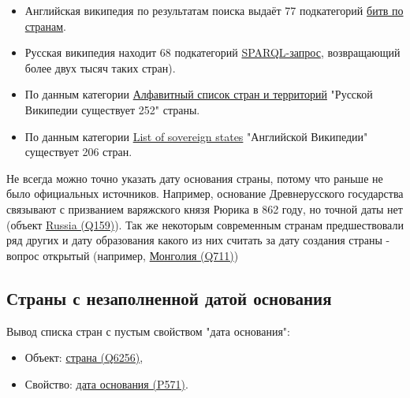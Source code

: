 
\begin{itemize}
    \item Английская википедия по результатам поиска выдаёт 77 подкатегорий \href{https://commons.wikimedia.org/wiki/Category:Battles_by_country}{битв по странам}.
    \item Русская википедия находит 68 подкатегорий \href{https://query.wikidata.org/#SELECT%20%3Fitem%20%3Flabel%20%3F_image%20WHERE%20%7B%0A%20%20%3Fitem%20wdt%3AP31%20wd%3AQ3024240.%0A%20%20SERVICE%20wikibase%3Alabel%20%7B%0A%20%20%20%20bd%3AserviceParam%20wikibase%3Alanguage%20%22en%22%20.%20%0A%20%20%20%20%3Fitem%20rdfs%3Alabel%20%3Flabel%0A%20%20%7D%0A%20%20%0AOPTIONAL%20%7B%20%3Fitem%20wdt%3AP18%20%3F_image.%20%7D%0A%7D%0A}{SPARQL-запрос}, возвращающий более двух тысяч таких стран).

    \item По данным категории \href{https://ru.wikipedia.org/wiki/%D0%90%D0%BB%D1%84%D0%B0%D0%B2%D0%B8%D1%82%D0%BD%D1%8B%D0%B9_%D1%81%D0%BF%D0%B8%D1%81%D0%BE%D0%BA_%D1%81%D1%82%D1%80%D0%B0%D0%BD_%D0%B8_%D1%82%D0%B5%D1%80%D1%80%D0%B8%D1%82%D0%BE%D1%80%D0%B8%D0%B9}{Алфавитный список стран и территорий} "Русской Википедии существует  252"  страны.

    \item По данным категории \href{https://www.wikipedia.org/wiki/en:List_of_sovereign_states}{List of sovereign states} "Английской Википедии" существует 206 стран.
    \end{itemize}

Не всегда можно точно указать дату основания страны, потому что раньше не было официальных источников. Например, основание Древнерусского государства связывают с призванием варяжского князя Рюрика в 862 году, но точной даты нет (объект \href{https://www.wikidata.org/wiki/Q159} {Russia (Q159)}). Так же некоторым современным странам предшествовали ряд других и дату образования какого из них считать за дату создания страны - вопрос открытый (например, \href{https://www.wikidata.org/wiki/Q711}{Монголия (Q711)})


\subsection{Страны с незаполненной датой основания}

Вывод списка стран с пустым свойством "дата основания":

\begin{itemize}
    \item Объект: \href{https://www.wikidata.org/wiki/Q6256}{страна (Q6256)},
    \item Свойство: \href{https://www.wikidata.org/wiki/Property:P571}{дата основания (P571)}.
\end{itemize}

